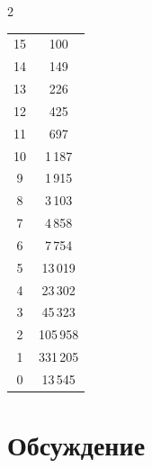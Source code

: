 \begin{multicols}{2}
\begin{center}
{\begin{tabular}{|c|c|}
   15&100\\

   14&149\\

   13&226\\

   12&425\\

   11&697\\

   10&1\,187\hphantom{9}\\

      \hphantom{9}9&1\,915\hphantom{9}\\

      \hphantom{9}8&3\,103\hphantom{9}\\

      \hphantom{9}7&4\,858\hphantom{9}\\

      \hphantom{9}6&7\,754\hphantom{9}\\

      \hphantom{9}5&13\,019\hphantom{99}\\

      \hphantom{9}4&23\,302\hphantom{99}\\

      \hphantom{9}3&45\,323\hphantom{99}\\

      \hphantom{9}2&105\,958\hphantom{999}\\

      \hphantom{9}1& 331\,205\hphantom{999}\\

   \hphantom{9}0&13\,545\hphantom{99}\\

   \hline

   \end{tabular}

}

\end{center}






\addtocounter{table}{1}

   





\section{Обсуждение}




\end{multicols}
